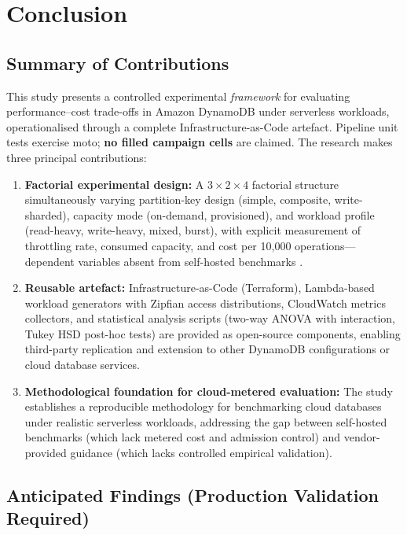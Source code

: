 \section{Conclusion}

\subsection{Summary of Contributions}

This study presents a controlled experimental \emph{framework} for evaluating performance–cost trade-offs in Amazon DynamoDB under serverless workloads, operationalised through a complete Infrastructure-as-Code artefact. Pipeline unit tests exercise moto; \textbf{no filled campaign cells} are claimed. The research makes three principal contributions:

\begin{enumerate}
    \item \textbf{Factorial experimental design:} A $3 \times 2 \times 4$ factorial structure simultaneously varying partition-key design (simple, composite, write-sharded), capacity mode (on-demand, provisioned), and workload profile (read-heavy, write-heavy, mixed, burst), with explicit measurement of throttling rate, consumed capacity, and cost per 10,000 operations—dependent variables absent from self-hosted benchmarks \citep{pantelic2026benchmarking}.
    
    \item \textbf{Reusable artefact:} Infrastructure-as-Code (Terraform), Lambda-based workload generators with Zipfian access distributions, CloudWatch metrics collectors, and statistical analysis scripts (two-way ANOVA with interaction, Tukey HSD post-hoc tests) are provided as open-source components, enabling third-party replication and extension to other DynamoDB configurations or cloud database services.
    
    \item \textbf{Methodological foundation for cloud-metered evaluation:} The study establishes a reproducible methodology for benchmarking cloud databases under realistic serverless workloads, addressing the gap between self-hosted benchmarks (which lack metered cost and admission control) and vendor-provided guidance (which lacks controlled empirical validation).
\end{enumerate}

\subsection{Anticipated Findings (Production Validation Required)}

